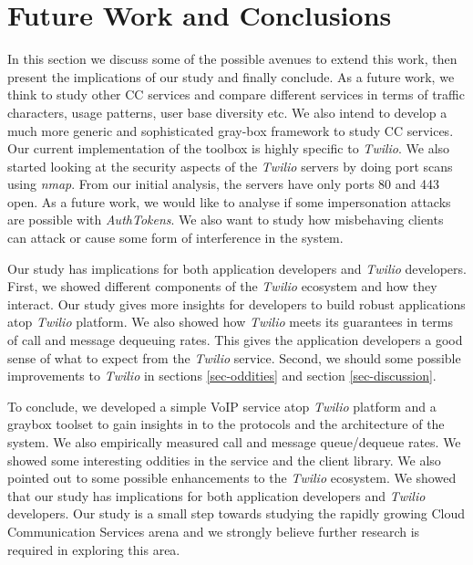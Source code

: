 \section{Future Work and Conclusions}
\label{sec-futureandconclusion}

In this section we discuss some of the possible avenues to extend this work, then present the implications of our study and finally conclude. As a future work, we think to study other CC services and compare different services in terms of traffic characters, usage patterns, user base diversity etc. We also intend to develop a much more generic and sophisticated gray-box framework to study CC services. Our current implementation of the toolbox is highly specific to \textit{Twilio}. We also started looking at the security aspects of the \textit{Twilio} servers by doing port scans using \textit{nmap}. From our initial analysis, the servers have only ports 80 and 443 open. As a future work, we would like to analyse if some impersonation attacks are possible with \textit{AuthTokens}. We also want to study how misbehaving clients can attack or cause some form of interference in the system.

Our study has implications for both application developers and \textit{Twilio} developers. First, we showed different components of the \textit{Twilio} ecosystem and how they interact. Our study gives more insights for developers to build robust applications atop \textit{Twilio} platform. We also showed how \textit{Twilio} meets its guarantees in terms of call and message dequeuing rates. This gives the application developers a good sense of what to expect from the \textit{Twilio} service. Second, we should some possible improvements to \textit{Twilio} in sections \ref{sec-oddities} and section \ref{sec-discussion}.

To conclude, we developed a simple VoIP service atop \textit{Twilio} platform and a graybox toolset to gain insights in to the protocols and the architecture of the system. We also empirically measured call and message queue/dequeue rates. We showed some interesting oddities in the service and the client library. We also pointed out to some possible enhancements to the \textit{Twilio} ecosystem. We showed that our study has implications for both application developers and \textit{Twilio} developers. Our study is a small step towards studying the rapidly growing Cloud Communication Services arena and we strongly believe further research is required in exploring this area. 